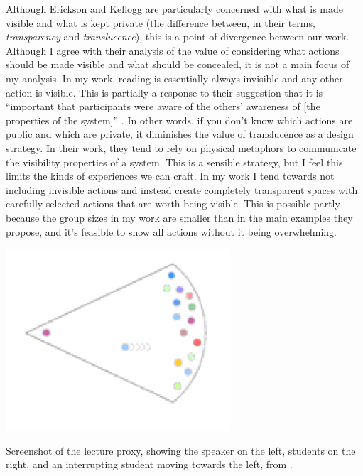 \documentclass{tufte-handout}
\begin{document}
Although Erickson and Kellogg are particularly concerned with what is made visible and what is kept private (the difference between, in their terms, \emph{transparency} and \emph{translucence}), this is a point of divergence between our work. Although I agree with their analysis of the value of considering what actions should be made visible and what should be concealed, it is not a main focus of my analysis. In my work, reading is essentially always invisible and any other action is visible. This is partially a response to their suggestion that it is ``important that participants were aware of the others' awareness of [the properties of the system]'' \citep{Erickson:2003td}. In other words, if you don't know which actions are public and which are private, it diminishes the value of translucence as a design strategy. In their work, they tend to rely on physical metaphors to communicate the visibility properties of a system. This is a sensible strategy, but I feel this limits the kinds of experiences we can craft. In my work I tend towards not including invisible actions and instead create completely transparent spaces with carefully selected actions that are worth being visible. This is possible partly because the group sizes in my work are smaller than in the main examples they propose, and it's feasible to show all actions without it being overwhelming. 

\begin{marginfigure}
	\includegraphics{figures/lecture.png}
	\caption{Screenshot of the lecture proxy, showing the speaker on the left, students on the right, and an interrupting student moving towards the left, from \citep{Erickson:2003td}.}
	\label{fig:proxy-lecture}
\end{marginfigure}
\end{document}
